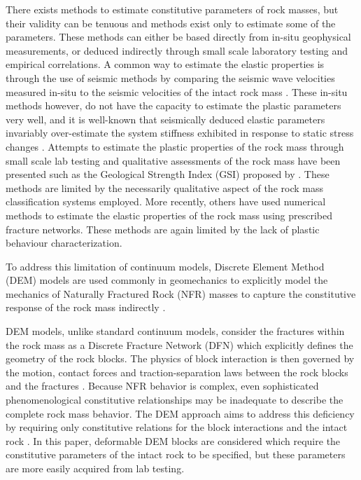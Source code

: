 There exists methods to estimate constitutive parameters of rock masses, but their validity can be tenuous and methods exist only to estimate some of the parameters. These methods can either be based directly from in-situ geophysical measurements, or deduced indirectly through small scale laboratory testing and empirical correlations. A common way to estimate the elastic properties is through the use of seismic methods by comparing the seismic wave velocities measured in-situ to the seismic velocities of the intact rock mass \citep{SJOGREN_1979}. These in-situ methods however, do not have the capacity to estimate the plastic parameters very well, and it is well-known that seismically deduced elastic parameters invariably over-estimate the system stiffness exhibited in response to static stress changes \citep{Barton_2006}. Attempts to estimate the plastic properties of the rock mass through small scale lab testing and qualitative assessments of the rock mass have been presented such as the Geological Strength Index (GSI) proposed by \citet{Hoek_1997}. These methods are limited by the necessarily qualitative aspect of the rock mass classification systems employed. More recently, others \citep{Min_2003,Chen_2012,Bidgoli_2013} have used numerical methods to estimate the elastic properties of the rock mass using prescribed fracture networks. These methods are again limited by the lack of plastic behaviour characterization. 

To address this limitation of continuum models, Discrete Element Method (DEM) models are used commonly in geomechanics to explicitly model the mechanics of Naturally Fractured Rock (NFR) masses to capture the constitutive response of the rock mass indirectly \citep{jing_review_2003}. 

DEM models, unlike standard continuum models, consider the fractures within the rock mass as a Discrete Fracture Network (DFN) which explicitly defines the geometry of the rock blocks. The physics of block interaction is then governed by the motion, contact forces and traction-separation laws between the rock blocks and the fractures \citep{Thallak_1990}. Because NFR behavior is complex, even sophisticated phenomenological constitutive relationships may be inadequate to describe the complete rock mass behavior. The DEM approach aims to address this deficiency by requiring only constitutive relations for the block interactions and the intact rock \citep{Barbosa_1990}. In this paper,  deformable DEM blocks are considered which require the constitutive parameters of the intact rock to be specified, but these parameters are more easily acquired from lab testing. 

